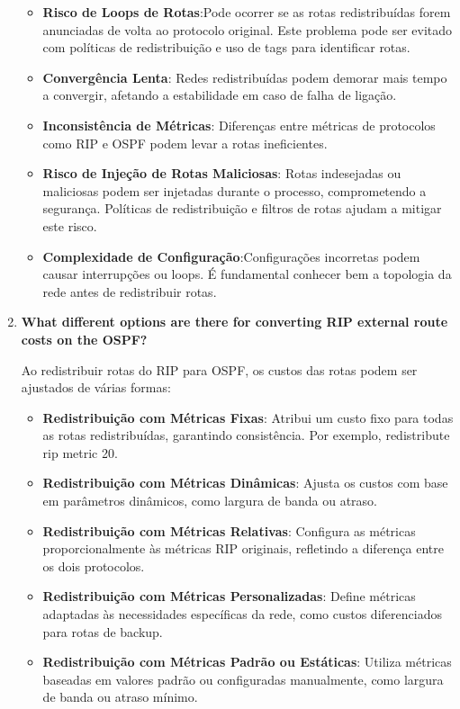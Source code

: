 \documentclass[11pt,english, openright, oneside]{book}
\begin{document}
\begin{enumerate}
  \begin{itemize}
    \item \textbf{Risco de Loops de Rotas}:Pode ocorrer se as rotas redistribuídas forem anunciadas de volta ao protocolo original. Este problema pode ser evitado com políticas de redistribuição e uso de tags para identificar rotas.
    \item \textbf{Convergência Lenta}: Redes redistribuídas podem demorar mais tempo a convergir, afetando a estabilidade em caso de falha de ligação.
    \item \textbf{Inconsistência de Métricas}: Diferenças entre métricas de protocolos como RIP e OSPF podem levar a rotas ineficientes.
    \item \textbf{Risco de Injeção de Rotas Maliciosas}: Rotas indesejadas ou maliciosas podem ser injetadas durante o processo, comprometendo a segurança. Políticas de redistribuição e filtros de rotas ajudam a mitigar este risco.
    \item \textbf{Complexidade de Configuração}:Configurações incorretas podem causar interrupções ou loops. É fundamental conhecer bem a topologia da rede antes de redistribuir rotas.
  \end{itemize}
  \vspace{0.2cm}

  \item \textbf{What different options are there for converting RIP external route costs on the OSPF?}
  \vspace{0.2cm}

  \par Ao redistribuir rotas do RIP para OSPF, os custos das rotas podem ser ajustados de várias formas:
  \vspace{0.2cm}

  \begin{itemize}
    \item \textbf{Redistribuição com Métricas Fixas}: Atribui um custo fixo para todas as rotas redistribuídas, garantindo consistência. Por exemplo, redistribute rip metric 20.
    \item \textbf{Redistribuição com Métricas Dinâmicas}: Ajusta os custos com base em parâmetros dinâmicos, como largura de banda ou atraso.
    \item \textbf{Redistribuição com Métricas Relativas}: Configura as métricas proporcionalmente às métricas RIP originais, refletindo a diferença entre os dois protocolos.
    \item \textbf{Redistribuição com Métricas Personalizadas}: Define métricas adaptadas às necessidades específicas da rede, como custos diferenciados para rotas de backup.
    \item \textbf{Redistribuição com Métricas Padrão ou Estáticas}: Utiliza métricas baseadas em valores padrão ou configuradas manualmente, como largura de banda ou atraso mínimo.
  \end{itemize}
  \vspace{0.2cm}
  \end{enumerate}
\end{document}
